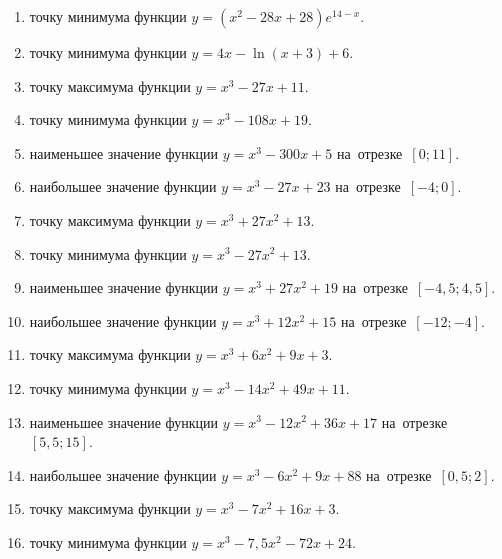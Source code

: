 \documentclass[a4paper,10pt]{article}
\begin{document}
\begin{enumerate}
\item {} точку минимума функции $y=\left(x^2-28x+28\right){{e}^{14-x}}$.

\item {} точку минимума функции $y=4x-\ln \left(x+3\right)+6$.

\item {} точку максимума функции $y=x^3 -27x +11$.

\item {} точку минимума функции $y=x^3 -108x+19$.

\item {} наименьшее значение функции $y=x^3 -300x+5$ на~отрезке~$\left[0;11\right]$.

\item {} наибольшее значение функции $y=x^3 -27x+23$ на~отрезке~$\left[-4;0\right]$.

\item {} точку максимума функции $y=x^3 +27x^2+13$.

\item {} точку минимума функции $y=x^3 -27x^2+13$.

\item {} наименьшее значение функции $y=x^3 +27x^2+19$ на~отрезке~$\left[-4,5;4,5\right]$.

\item {} наибольшее значение функции $y=x^3 +12x^2+15$ на~отрезке~$\left[-12;-4\right]$.

\item {} точку максимума функции $y=x^3 +6x^2+9x+3$.

\item {} точку минимума функции $y=x^3 -14x^2+49x+11$.

\item {} наименьшее значение функции $y=x^3 -12x^2+36x+17$ на~отрезке~$\left[5,5;15\right]$.

\item {} наибольшее значение функции $y=x^3 -6x^2+9x+88$ на~отрезке~$\left[0,5;2\right]$.

\item {} точку максимума функции $y=x^3 -7x^2+16x+3$.

\item {} точку минимума функции $y=x^3 -7,5x^2-72x+24$.


\end{enumerate}
\end{document}
